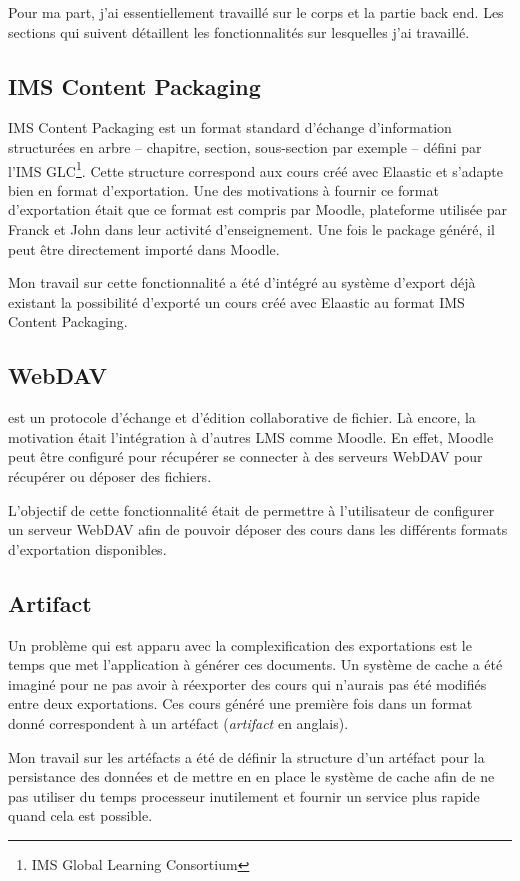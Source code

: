Pour ma part, j'ai essentiellement travaillé sur le corps et la partie back end.
Les sections qui suivent détaillent les fonctionnalités sur lesquelles j'ai
travaillé.

\subsection{IMS Content Packaging}
IMS Content Packaging est un format standard d'échange d'information structurées
en arbre -- chapitre, section, sous-section par exemple -- défini par l'IMS
GLC\footnote{IMS Global Learning Consortium}. Cette structure correspond aux
cours créé avec Elaastic et s'adapte bien en format d'exportation. Une des
motivations à fournir ce format d'exportation était que ce format est compris
par Moodle, plateforme utilisée par Franck et John dans leur activité
d'enseignement. Une fois le package généré, il peut être directement importé
dans Moodle.

Mon travail sur cette fonctionnalité a été d'intégré au système d'export déjà
existant la possibilité d'exporté un cours créé avec Elaastic au format IMS
Content Packaging.

\subsection{WebDAV}
 est un protocole d'échange et d'édition collaborative de fichier.
Là encore, la motivation était l'intégration à d'autres LMS comme Moodle. En
effet, Moodle peut être configuré pour récupérer se connecter à des serveurs
WebDAV pour récupérer ou déposer des fichiers.

L'objectif de cette fonctionnalité était de permettre à l'utilisateur de
configurer un serveur WebDAV afin de pouvoir déposer des cours dans les
différents formats d'exportation disponibles.

\subsection{Artifact}
Un problème qui est apparu avec la complexification des exportations est le
temps que met l'application à générer ces documents. Un système de cache a été
imaginé pour ne pas avoir à réexporter des cours qui n'aurais pas été modifiés
entre deux exportations. Ces cours généré une première fois dans un format donné
correspondent à un artéfact ({\em artifact} en anglais).

Mon travail sur les artéfacts a été de définir la structure d'un artéfact pour la
persistance des données et de mettre en en place le système de cache afin de ne
pas utiliser du temps processeur inutilement et fournir un service plus rapide
quand cela est possible.

